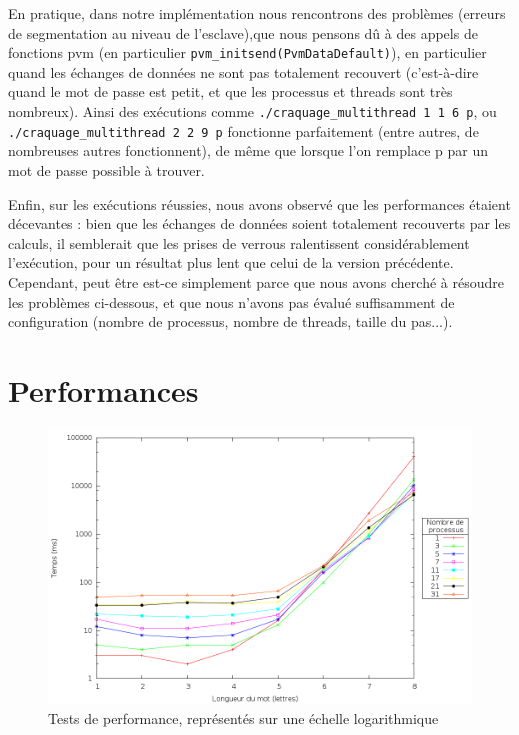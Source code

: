 \documentclass[a4paper,11pt]{article}
\begin{document}
En pratique, dans notre implémentation nous rencontrons des problèmes (erreurs de segmentation au niveau de l'esclave),que nous pensons dû à des appels de fonctions pvm (en particulier \texttt{pvm\_initsend(PvmDataDefault)}), en particulier quand les échanges de données ne sont pas totalement recouvert (c'est-à-dire quand le mot de passe est petit, et que les processus et threads sont très nombreux).
Ainsi des exécutions comme \texttt{./craquage\_multithread 1 1 6 p}, ou \texttt{./craquage\_multithread 2 2 9 p} fonctionne parfaitement (entre autres, de nombreuses autres fonctionnent), de même que lorsque l'on remplace p par un mot de passe possible à trouver.


Enfin, sur les exécutions réussies, nous avons observé que les performances étaient décevantes : bien que les échanges de données soient totalement recouverts par les calculs, il semblerait que les prises de verrous ralentissent considérablement l'exécution, pour un résultat plus lent que celui de la version précédente.
Cependant, peut être est-ce simplement parce que nous avons cherché à résoudre les problèmes ci-dessous, et que nous n'avons pas évalué suffisamment de configuration (nombre de processus, nombre de threads, taille du pas...).
\section{Performances}
\begin{figure}[h!]
  \centering
  \includegraphics[width=\textwidth]{plot_log.png}
  \caption{Tests de performance, représentés sur une échelle logarithmique}
  \label{perf_loga}
\end{figure}
\end{document}
